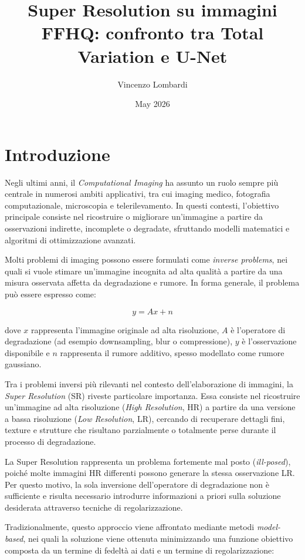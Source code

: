 \documentclass{article}
\title{Super Resolution su immagini FFHQ: confronto tra Total Variation e U-Net}
\author{Vincenzo Lombardi}
\date{May 2026}
\begin{document}
\maketitle

\section{Introduzione}

Negli ultimi anni, il \textit{Computational Imaging} ha assunto un ruolo sempre più centrale in numerosi ambiti applicativi, tra cui imaging medico, fotografia computazionale, microscopia e telerilevamento. In questi contesti, l’obiettivo principale consiste nel ricostruire o migliorare un’immagine a partire da osservazioni indirette, incomplete o degradate, sfruttando modelli matematici e algoritmi di ottimizzazione avanzati.

Molti problemi di imaging possono essere formulati come \textit{inverse problems}, nei quali si vuole stimare un’immagine incognita ad alta qualità a partire da una misura osservata affetta da degradazione e rumore. In forma generale, il problema può essere espresso come:

\[
y = Ax + n
\]

dove \(x\) rappresenta l’immagine originale ad alta risoluzione, \(A\) è l’operatore di degradazione (ad esempio downsampling, blur o compressione), \(y\) è l’osservazione disponibile e \(n\) rappresenta il rumore additivo, spesso modellato come rumore gaussiano.

Tra i problemi inversi più rilevanti nel contesto dell’elaborazione di immagini, la \textit{Super Resolution} (SR) riveste particolare importanza. Essa consiste nel ricostruire un’immagine ad alta risoluzione (\textit{High Resolution}, HR) a partire da una versione a bassa risoluzione (\textit{Low Resolution}, LR), cercando di recuperare dettagli fini, texture e strutture che risultano parzialmente o totalmente perse durante il processo di degradazione.

La Super Resolution rappresenta un problema fortemente mal posto (\textit{ill-posed}), poiché molte immagini HR differenti possono generare la stessa osservazione LR. Per questo motivo, la sola inversione dell’operatore di degradazione non è sufficiente e risulta necessario introdurre informazioni a priori sulla soluzione desiderata attraverso tecniche di regolarizzazione.

Tradizionalmente, questo approccio viene affrontato mediante metodi \textit{model-based}, nei quali la soluzione viene ottenuta minimizzando una funzione obiettivo composta da un termine di fedeltà ai dati e un termine di regolarizzazione:
\end{document}
